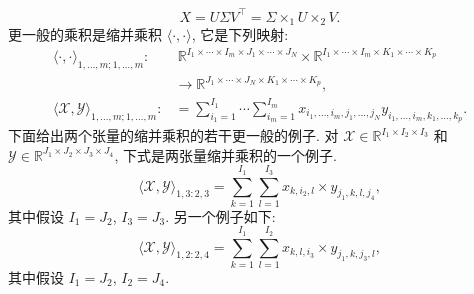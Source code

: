 \[X=U\Sigma V^{\top}=\Sigma\times_1U\times_2V.\]
{更一般的乘积是缩并乘积 $\langle\cdot,\cdot\rangle$, 它是下列映射:}
\[\begin{aligned}
\langle\cdot,\cdot\rangle_{1,\ldots,m;1,\ldots,m}:&\ \mathbb{R}^{I_1\times\cdots\times I_m\times J_1\times\cdots\times J_N}\times\mathbb{R}^{I_1\times\cdots\times I_m\times K_1\times\cdots\times K_p}\\
&\to\mathbb{R}^{J_1\times\cdots\times J_N\times K_1\times\cdots\times K_p},\\
\langle\mathcal{X},\mathcal{Y}\rangle_{1,\ldots,m;1,\ldots,m}:&=\sum_{i_1=1}^{I_1}\cdots\sum_{i_m=1}^{I_m}x_{i_1,\ldots,i_m,j_1,\ldots,j_N}y_{i_1,\ldots,i_m,k_1,\ldots,k_p}.
\end{aligned}\]
{下面给出两个张量的缩并乘积的若干更一般的例子. 对 $\mathcal{X}\in\mathbb{R}^{I_1\times I_2\times I_3}$ 和 $\mathcal{Y}\in\mathbb{R}^{J_1\times J_2\times J_3\times J_4}$, 下式是两张量缩并乘积的一个例子.}
\[\langle\mathcal{X},\mathcal{Y}\rangle_{1,3:2,3}=\sum_{k=1}^{I_1}\sum_{l=1}^{I_3}x_{k,i_2,l}\times y_{j_1,k,l,j_4},\]
{其中假设 $I_1=J_2$, $I_3=J_3$. 另一个例子如下:}
\[\langle\mathcal{X},\mathcal{Y}\rangle_{1,2:2,4}=\sum_{k=1}^{I_1}\sum_{l=1}^{I_2}x_{k,l,i_3}\times y_{j_1,k,j_3,l},\]
{其中假设 $I_1=J_2$, $I_2=J_4$.}
